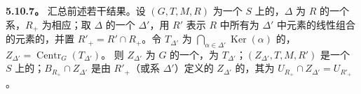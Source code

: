\textbf{5.10.7。} 汇总前述若干结果。设 $(G,T,M,R)$ 为一个 $S$ 上的，$\Delta$ 为 $R$ 的一个系，$R_+$ 为相应；取 $\Delta$ 的一个 $\Delta'$，用 $R'$ 表示 $R$ 中所有为 $\Delta'$ 中元素的线性组合的元素的，并置 $R'_+=R'\cap R_+$。令 $T_{\Delta'}$ 为 $\bigcap_{\alpha\in\Delta'}\operatorname{Ker}(\alpha)$ 的，$Z_{\Delta'}=\operatorname{Centr}_G(T_{\Delta'})$。
则 $Z_{\Delta'}$ 为 $G$ 的一个，为 $T_{\Delta'}$；$(Z_{\Delta'},T,M,R')$ 是一个 $S$ 上的；$B_{R_+}\cap Z_{\Delta'}$ 是由 $R'_+$（或系 $\Delta'$）定义的 $Z_{\Delta'}$ 的，其为 $U_{R_+}\cap Z_{\Delta'}=U_{R'_+}$。

